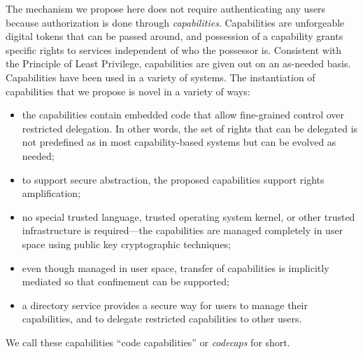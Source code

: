 \documentclass[10pt, conference, compsocconf]{IEEEtran}
\begin{document}
\begin{comment}
Another problem is the following.  Suppose a person, Alice, has a
cool new idea for photo processing and deploys her application on a
hosted web server, using Amazon's S3 to store processed photos.  If
all access to the application goes through her web server and the
application becomes popular, Alice's server may quickly become a
bottleneck.  If, instead, Alice distributes a library to users,
then the library will need to contain credentials to access S3.
This may place too much power in the hands of the users, and
also prevents any kind of fine grained control, such as allowing
users to read only parts of an S3 file.
\end{comment}

The mechanism we propose here does not require authenticating any
users because authorization is done through \emph{capabilities}.
Capabilities are unforgeable digital tokens that can be passed
around, and possession of a capability grants specific rights to
services independent of who the possessor is.  Consistent with the
Principle of Least Privilege, capabilities are given out on an
as-needed basis.  Capabilities have been used in a variety of
systems.  The instantiation of capabilities that we propose is novel
in a variety of ways:

\begin{itemize}
\item the capabilities contain embedded code that allow fine-grained
control over restricted delegation.  In other words, the set of rights
that can be delegated is not predefined as in most capability-based
systems but can be evolved as needed;
\item to support secure abstraction, the proposed capabilities support
rights amplification;
\item no special trusted language, trusted operating system kernel,
or other trusted infrastructure is required---the capabilities are
managed completely in user space using public key cryptographic techniques;
\item even though managed in user space, transfer of capabilities is
implicitly mediated so that confinement can be supported;
\item a directory service provides a secure way for users to manage
their capabilities, and to delegate restricted capabilities to other
users.
\end{itemize}

\noindent
We call these capabilities ``code capabilities'' or \emph{codecaps}
for short.
\end{document}
